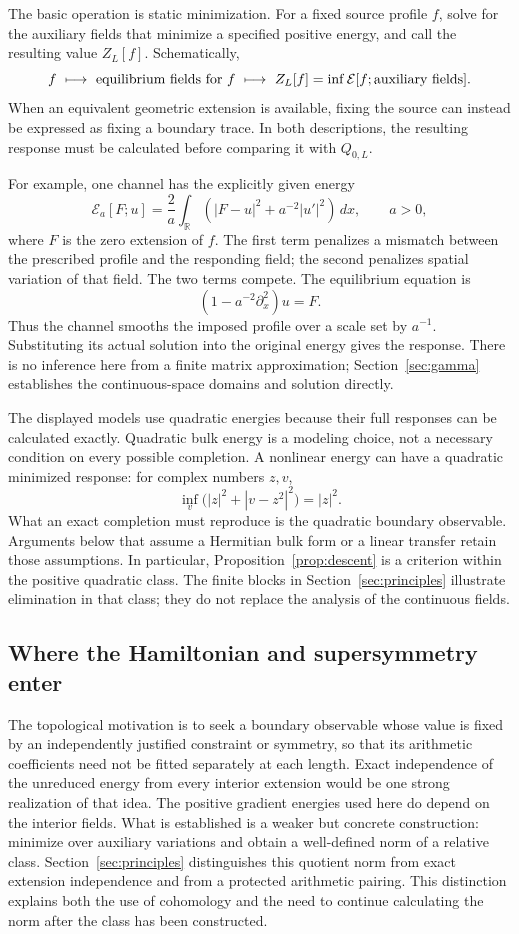 \documentclass[11pt]{article}
\numberwithin{equation}{section}
\theoremstyle{definition}
\theoremstyle{remark}
\newcommand{\R}{\mathbb R}
\begin{document}
The basic operation is static minimization. For a fixed source profile $f$, solve for the auxiliary fields that minimize a specified positive energy, and call the resulting value $Z_L[f]$. Schematically,
\[
f\ \longmapsto\ \hbox{equilibrium fields for }f\
\longmapsto\ Z_L[f]=\inf\mathcal E[f;\hbox{auxiliary fields}].
\]
When an equivalent geometric extension is available, fixing the source can instead be expressed as fixing a boundary trace. In both descriptions, the resulting response must be calculated before comparing it with $Q_{0,L}$.

For example, one channel has the explicitly given energy
\[
\mathcal E_a[F;u]
=\frac2a\int_{\R}
\left(|F-u|^2+a^{-2}|u'|^2\right)\,dx,
\qquad a>0,
\]
where $F$ is the zero extension of $f$. The first term penalizes a mismatch between the prescribed profile and the responding field; the second penalizes spatial variation of that field. The two terms compete. The equilibrium equation is
\[
(1-a^{-2}\partial_x^2)u=F.
\]
Thus the channel smooths the imposed profile over a scale set by $a^{-1}$. Substituting its actual solution into the original energy gives the response. There is no inference here from a finite matrix approximation; Section~\ref{sec:gamma} establishes the continuous-space domains and solution directly.

The displayed models use quadratic energies because their full responses can be calculated exactly. Quadratic bulk energy is a modeling choice, not a necessary condition on every possible completion. A nonlinear energy can have a quadratic minimized response: for complex numbers $z,v$,
\[
\inf_v\bigl(|z|^2+|v-z^2|^2\bigr)=|z|^2.
\]
What an exact completion must reproduce is the quadratic boundary observable. Arguments below that assume a Hermitian bulk form or a linear transfer retain those assumptions. In particular, Proposition~\ref{prop:descent} is a criterion within the positive quadratic class. The finite blocks in Section~\ref{sec:principles} illustrate elimination in that class; they do not replace the analysis of the continuous fields.

\subsection*{Where the Hamiltonian and supersymmetry enter}
The topological motivation is to seek a boundary observable whose value is fixed by an independently justified constraint or symmetry, so that its arithmetic coefficients need not be fitted separately at each length. Exact independence of the unreduced energy from every interior extension would be one strong realization of that idea. The positive gradient energies used here do depend on the interior fields. What is established is a weaker but concrete construction: minimize over auxiliary variations and obtain a well-defined norm of a relative class. Section~\ref{sec:principles} distinguishes this quotient norm from exact extension independence and from a protected arithmetic pairing. This distinction explains both the use of cohomology and the need to continue calculating the norm after the class has been constructed.
\end{document}
